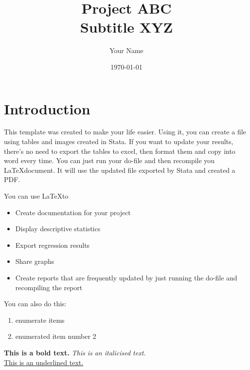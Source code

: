 \documentclass{article}
\title{Project ABC \\ Subtitle XYZ} 	%
\author{Your Name}
\date{\today}
\begin{document}
	
\maketitle
\tableofcontents

\newpage
\listoffigures
\listoftables

\newpage
\section{Introduction} %

This template was created to make your life easier. Using it, you can create a file using tables and images created in Stata. If you want to update your results, there's no need to export the tables to excel, then format them and copy into word every time. You can just run your do-file and then recompile you \LaTeX document. It will use the updated file exported by Stata and created a PDF.

You can use \LaTeX to
\begin{itemize} %
	\item Create documentation for your project
	\item Display descriptive statistics
	\item Export regression results
	\item Share graphs
	\item Create reports that are frequently updated by just running the do-file and recompiling the report
\end{itemize}

You can also do this:
\begin{enumerate}
	\item enumerate items
	\item enumerated item number 2
\end{enumerate}

\textbf{This is a bold text.} \newline  \textit{This is an italicised text.} \\
\underline{This is an underlined text.}

\end{document}
